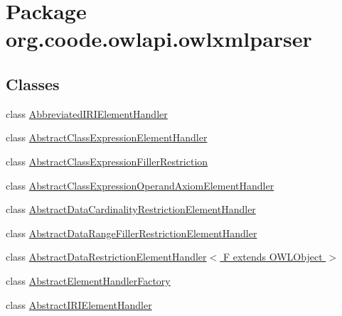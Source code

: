 \hypertarget{namespaceorg_1_1coode_1_1owlapi_1_1owlxmlparser}{\section{Package org.\-coode.\-owlapi.\-owlxmlparser}
\label{namespaceorg_1_1coode_1_1owlapi_1_1owlxmlparser}
}
\subsection*{Classes}
\begin{DoxyCompactItemize}
\item 
class \hyperlink{classorg_1_1coode_1_1owlapi_1_1owlxmlparser_1_1_abbreviated_i_r_i_element_handler}{Abbreviated\-I\-R\-I\-Element\-Handler}
\item 
class \hyperlink{classorg_1_1coode_1_1owlapi_1_1owlxmlparser_1_1_abstract_class_expression_element_handler}{Abstract\-Class\-Expression\-Element\-Handler}
\item 
class \hyperlink{classorg_1_1coode_1_1owlapi_1_1owlxmlparser_1_1_abstract_class_expression_filler_restriction}{Abstract\-Class\-Expression\-Filler\-Restriction}
\item 
class \hyperlink{classorg_1_1coode_1_1owlapi_1_1owlxmlparser_1_1_abstract_class_expression_operand_axiom_element_handler}{Abstract\-Class\-Expression\-Operand\-Axiom\-Element\-Handler}
\item 
class \hyperlink{classorg_1_1coode_1_1owlapi_1_1owlxmlparser_1_1_abstract_data_cardinality_restriction_element_handler}{Abstract\-Data\-Cardinality\-Restriction\-Element\-Handler}
\item 
class \hyperlink{classorg_1_1coode_1_1owlapi_1_1owlxmlparser_1_1_abstract_data_range_filler_restriction_element_handler}{Abstract\-Data\-Range\-Filler\-Restriction\-Element\-Handler}
\item 
class \hyperlink{classorg_1_1coode_1_1owlapi_1_1owlxmlparser_1_1_abstract_data_restriction_element_handler_3_01_f_01extends_01_o_w_l_object_01_4}{Abstract\-Data\-Restriction\-Element\-Handler$<$ F extends O\-W\-L\-Object $>$}
\item 
class \hyperlink{classorg_1_1coode_1_1owlapi_1_1owlxmlparser_1_1_abstract_element_handler_factory}{Abstract\-Element\-Handler\-Factory}
\item 
class \hyperlink{classorg_1_1coode_1_1owlapi_1_1owlxmlparser_1_1_abstract_i_r_i_element_handler}{Abstract\-I\-R\-I\-Element\-Handler}
\item 

\end{DoxyCompactItemize}
